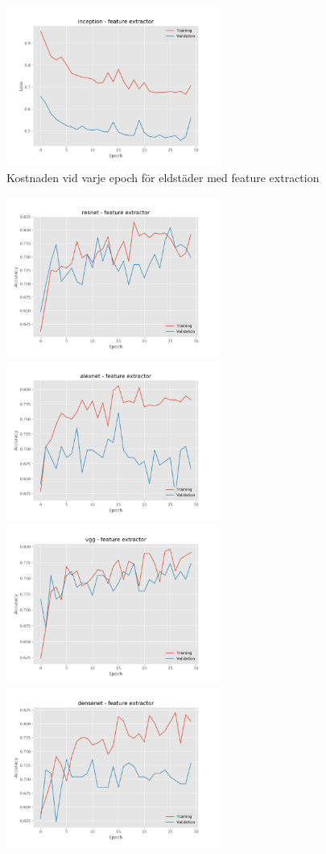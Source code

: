\documentclass[]{kththesis}
\begin{document}
\begin{figure}[h]
    \includegraphics[width=7cm]{f_l_inception_fe}
    \caption{Kostnaden vid varje epoch för eldstäder med feature extraction}
    \label{fig:f_l_1}
  \end{figure}
  
  \begin{figure}[h]
    \includegraphics[width=7cm]{f_a_resnet_fe}
    \includegraphics[width=7cm]{f_a_alexnet_fe}
    \includegraphics[width=7cm]{f_a_vgg_fe}
    \includegraphics[width=7cm]{f_a_densenet_fe}

\end{figure}
\end{document}
